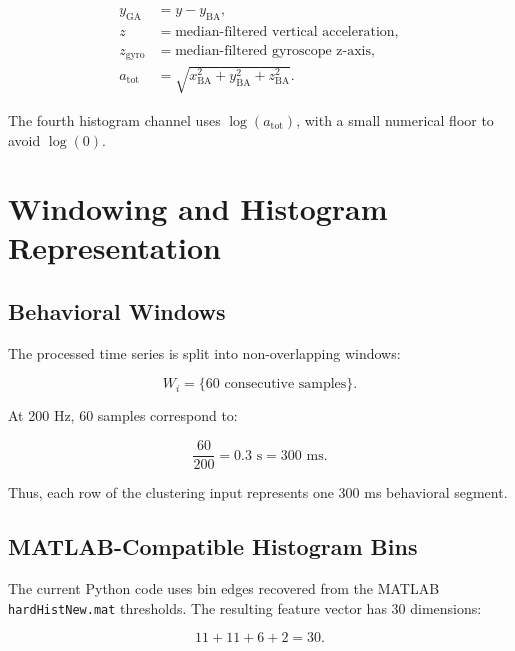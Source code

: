 \documentclass[11pt]{article}
\begin{document}
\begin{align}
    y_{\mathrm{GA}} &= y - y_{\mathrm{BA}}, \\
    z &= \text{median-filtered vertical acceleration}, \\
    z_{\mathrm{gyro}} &= \text{median-filtered gyroscope z-axis}, \\
    a_{\mathrm{tot}} &= \sqrt{x_{\mathrm{BA}}^2 + y_{\mathrm{BA}}^2 + z_{\mathrm{BA}}^2}.
\end{align}

The fourth histogram channel uses $\log(a_{\mathrm{tot}})$, with a small numerical floor to avoid $\log(0)$.

\FloatBarrier
\section{Windowing and Histogram Representation}

\subsection{Behavioral Windows}

The processed time series is split into non-overlapping windows:

\begin{equation}
    W_i = \{60 \text{ consecutive samples}\}.
\end{equation}

At 200 Hz, 60 samples correspond to:

\begin{equation}
    \frac{60}{200} = 0.3 \text{ s} = 300 \text{ ms}.
\end{equation}

Thus, each row of the clustering input represents one 300 ms behavioral segment.

\subsection{MATLAB-Compatible Histogram Bins}

The current Python code uses bin edges recovered from the MATLAB \texttt{hardHistNew.mat} thresholds. The resulting feature vector has 30 dimensions:

\begin{equation}
    11 + 11 + 6 + 2 = 30.
\end{equation}
\end{document}
